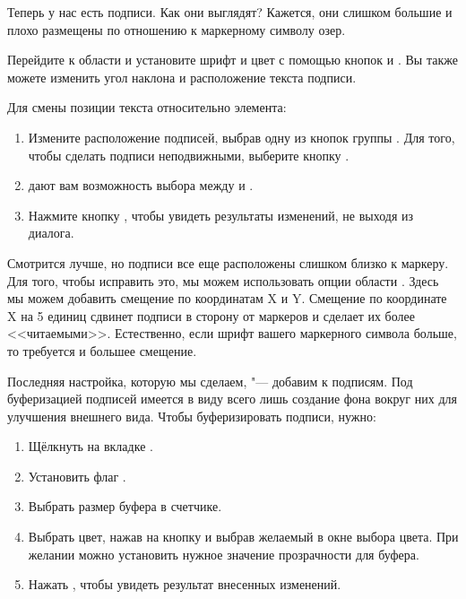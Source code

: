 Теперь у нас есть подписи. Как они выглядят? Кажется, они слишком большие
и плохо размещены по отношению к маркерному символу озер.

Перейдите к области  и установите шрифт и цвет с помощью кнопок
 и . Вы также можете изменить угол наклона и
расположение текста подписи.

Для смены позиции текста относительно элемента:

\begin{enumerate}
\item Измените расположение подписей, выбрав одну из кнопок группы .
Для того, чтобы сделать подписи неподвижными, выберите кнопку .
\item {} дают вам возможность
выбора между  и .
\item Нажмите кнопку , чтобы увидеть результаты
изменений, не выходя из диалога.
\end{enumerate}

Смотрится лучше, но подписи все еще расположены слишком близко к маркеру.
Для того, чтобы исправить это, мы можем использовать опции области .
Здесь мы можем добавить смещение по координатам X и Y. Смещение по координате
X на 5 единиц сдвинет подписи в сторону от маркеров и сделает их более
<<читаемыми>>. Естественно, если шрифт вашего маркерного символа больше,
то требуется и большее смещение.

Последняя настройка, которую мы сделаем, "--- добавим
 к подписям. Под буферизацией подписей имеется
в виду всего лишь создание фона вокруг них для улучшения внешнего вида.
Чтобы буферизировать подписи, нужно:

\begin{enumerate}
\item Щёлкнуть на вкладке .
\item Установить флаг .
\item Выбрать размер буфера в счетчике.
\item Выбрать цвет, нажав на кнопку  и выбрав желаемый в
окне выбора цвета. При желании можно установить нужное значение
прозрачности для буфера.
\item Нажать , чтобы увидеть результат внесенных изменений.
\end{enumerate}

